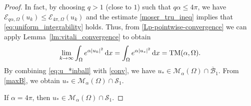 \documentclass[reqno,11pt]{amsart}
\theoremstyle{definition}
\newcommand{\ud}{\,\mathrm{d}}
\begin{document}
\begin{proof}
 		\noindent In fact, by choosing $q>1$ (close to $1$) such that $q\alpha\le 4\pi$, we 
        have $\mathscr{E}_{q\alpha, \Omega} (u_k)\le  \mathscr{E}_{4\pi, \Omega} (u_k)$ and the 
        estimate \eqref{moser_tru_ineq} implies that \eqref{eq:uniform_integrability} holds. 
        Thus, from \eqref{Lp-pointwise-convergence} we can apply  Lemma~\ref{lm:vitali_convergence} to 
        obtain
		\begin{equation}\label{conv}
			\lim_{k\to\infty}\int_{\Omega} e^{\alpha {|u_{k}|}^{2}}\ud x = \int_{\Omega} 
            e^{\alpha {|u_*|}^{2}}\ud x={\rm TM}(\alpha,\Omega).
		\end{equation}
       By combining \eqref{eq:u_*inball} with \eqref{conv}, we have $u_*\in
       \mathcal{M}_\alpha(\Omega)\cap\overline{\mathcal{B}}_1.$ From \eqref{maxB}, we 
       obtain $u_*\in \mathcal{M}_\alpha(\Omega)\cap \mathcal{S}_1$.
        
         If $\alpha=4\pi$, then $u_*\in \mathcal{M}_\alpha(\Omega)\cap \mathcal{S}_1$.



\end{proof}
\end{document}
